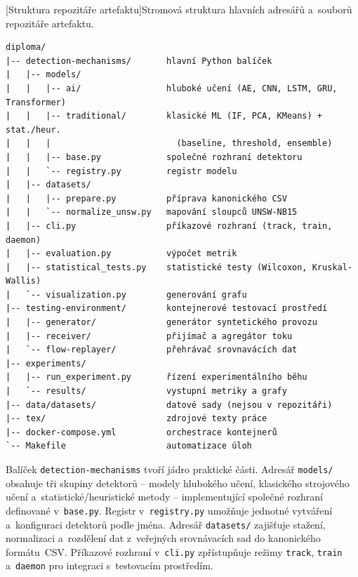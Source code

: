 \needspace{0.48\textheight}
\begin{minipage}{\textwidth}
\captionsetup{skip=6pt}
[Struktura repozitáře artefaktu]{Stromová struktura hlavních adresářů a~souborů repozitáře artefaktu.}
\label{tab:struktura-repozitare}
\vspace{0.35em}
\begin{Verbatim}[fontsize=\footnotesize,frame=single,baselinestretch=0.96]
diploma/
|-- detection-mechanisms/       hlavní Python balíček
|   |-- models/
|   |   |-- ai/                 hluboké učení (AE, CNN, LSTM, GRU, Transformer)
|   |   |-- traditional/        klasické ML (IF, PCA, KMeans) + stat./heur.
|   |   |                         (baseline, threshold, ensemble)
|   |   |-- base.py             společné rozhraní detektoru
|   |   `-- registry.py         registr modelu
|   |-- datasets/
|   |   |-- prepare.py          příprava kanonického CSV
|   |   `-- normalize_unsw.py   mapování sloupců UNSW-NB15
|   |-- cli.py                  příkazové rozhraní (track, train, daemon)
|   |-- evaluation.py           výpočet metrik
|   |-- statistical_tests.py    statistické testy (Wilcoxon, Kruskal-Wallis)
|   `-- visualization.py        generování grafu
|-- testing-environment/        kontejnerové testovací prostředí
|   |-- generator/              generátor syntetického provozu
|   |-- receiver/               přijímač a agregátor toku
|   `-- flow-replayer/          přehrávač srovnavácích dat
|-- experiments/
|   |-- run_experiment.py       řízení experimentálního běhu
|   `-- results/                vystupní metriky a grafy
|-- data/datasets/              datové sady (nejsou v repozitáři)
|-- tex/                        zdrojové texty práce
|-- docker-compose.yml          orchestrace kontejnerů
`-- Makefile                    automatizace úloh
\end{Verbatim}
\end{minipage}

Balíček \texttt{detection-mechanisms} tvoří jádro praktické části. Adresář \texttt{models/} obsahuje tři skupiny detektorů -- modely hlubokého učení, klasického strojového učení a~statistické/heuristické metody -- implementující společné rozhraní definované v~\texttt{base.py}. Registr v~\texttt{registry.py} umožňuje jednotné vytváření a~konfiguraci detektorů podle jména. Adresář \texttt{datasets/} zajišťuje stažení, normalizaci a~rozdělení dat z~veřejných srovnávacích sad do kanonického formátu~CSV. Příkazové rozhraní v~\texttt{cli.py} zpřístupňuje režimy \texttt{track}, \texttt{train} a~\texttt{daemon} pro integraci s~testovacím prostředím.

